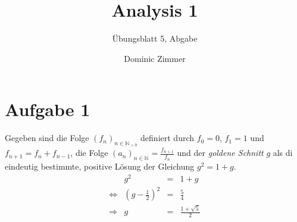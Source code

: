 \documentclass{scrreprt}
\newcommand{\NN}{\mathbb{N}}
\begin{document}
	\title{Analysis 1}
 	\author{Dominic Zimmer}
 	\subtitle{Übungsblatt 5, Abgabe}
 	\publishers{Übungsgruppe: Rami Ahmad}
  	\maketitle 


	\section*{Aufgabe 1}
	Gegeben sind die Folge $(f_n)_{n \in \NN_{>0}}$ definiert durch $f_0 = 0$, $f_1= 1$ und $f_{n+1} = f_n + f_{n-1}$, die Folge $(a_n)_{n \in \NN} = \frac{f_{n+1}}{f_n}$ und der \emph{goldene Schnitt} $g$ als di eindeutig bestimmte, positive Lösung der Gleichung $g^2 = 1+g$.
	\begin{align*}
		 & g^2 & = & 1+g 	\\
		\Leftrightarrow & \left(g - \frac{1}{2} \right)^2 & = & \frac{5}{4}\\
		\Rightarrow & g & = & \frac{1 + \sqrt{5}}{2}\\
    \end{align*}
\end{document}

